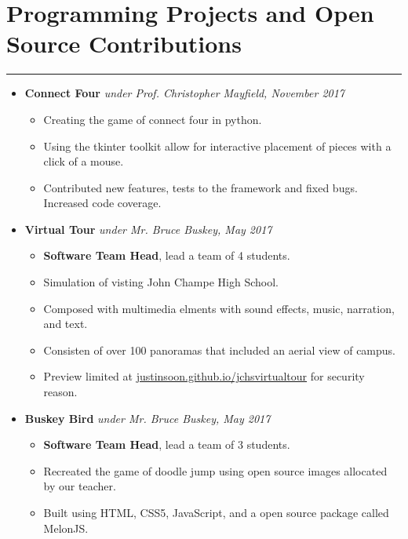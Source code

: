 \documentclass[a4paper]{article}
\begin{document}
\section*{Programming Projects and Open Source Contributions}
\hrule
\vspace{3mm}
\begin{itemize}
	\item
	      \textbf{Connect Four}
	      \hfill \textit{under Prof. Christopher Mayfield, November 2017}
	      \begin{itemize}
	      	\vspace{-2mm} \setlength\itemsep{-0.7mm}
		\item Creating the game of connect four in python.
		\item Using the tkinter toolkit allow for interactive placement of pieces with a click of a mouse.
		\item Contributed new features, tests to the framework and fixed bugs. Increased code coverage.
	      \end{itemize}
	\item
	      \textbf{Virtual Tour}
	      \hfill \textit{under Mr. Bruce Buskey, May 2017}
	      \begin{itemize}
	      	\vspace{-2mm} \setlength\itemsep{-0.7mm}
		\item \textbf{Software Team Head}, lead a team of 4 students.
		\item Simulation of visting John Champe High School.
		\item Composed with multimedia elments with sound effects, music, narration, and text.
		\item Consisten of over 100 panoramas that included an aerial view of campus.
		\item Preview limited at \href{https://justinsoon.github.io/jchsvirtualtour/}{justinsoon.github.io/jchsvirtualtour} for security reason. 
	      \end{itemize}
	\item
	      \textbf{Buskey Bird}
	      \hfill \textit{under Mr. Bruce Buskey, May 2017}
	      \begin{itemize}
	      	\vspace{-2mm} \setlength\itemsep{-0.7mm}
		\item \textbf{Software Team Head}, lead a team of 3 students.
		\item Recreated the game of doodle jump using open source images allocated by our teacher.
		\item Built using HTML, CSS5, JavaScript, and a open source package called MelonJS.

\end{itemize}
\end{itemize}
\end{document}
